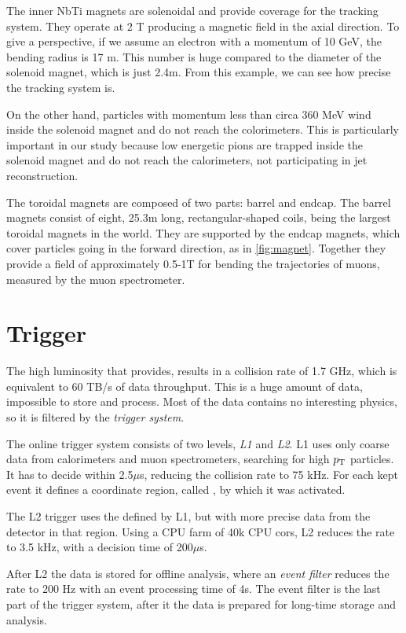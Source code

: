 The inner NbTi magnets are solenoidal and provide coverage for the tracking system.
They operate at 2 T producing a magnetic field in the axial direction.
To give a perspective, if we assume an electron with a momentum of 10 GeV, the bending radius is 17 m.
This number is huge compared to the diameter of the solenoid magnet, which is just 2.4m. 
From this example, we can see how precise the tracking system is.

On the other hand, particles with momentum less than circa 360 MeV wind inside the solenoid magnet and do not reach the colorimeters.
This is particularly important in our study because low energetic pions are trapped inside the solenoid magnet and do not reach the calorimeters, not participating in jet reconstruction.

The toroidal magnets are composed of two parts: barrel and endcap.
The barrel magnets consist of eight, 25.3m long, rectangular-shaped coils, being the largest toroidal magnets in the world.
They are supported by the endcap magnets, which cover particles going in the forward direction, as in \cref{fig:magnet}.
Together they provide a field of approximately 0.5-1T for bending the trajectories of muons, measured by the muon spectrometer. 


\section{Trigger}
\label{sec:trigger}
The high luminosity that \LHC provides, results in a collision rate of 1.7 GHz, which is equivalent to 60 TB/s of data throughput.
This is a huge amount of data, impossible to store and process.
Most of the data contains no interesting physics, so it is filtered by the \emph{trigger system}.

The online trigger system consists of two levels, \emph{L1} and \emph{L2}. 
L1 uses only coarse data from calorimeters and muon spectrometers, searching for high $p_\text{T}$ particles.
It has to decide within 2.5$\mu$s, reducing the collision rate to 75 kHz.
For each kept event it defines a coordinate region, called \RoI, by which it was activated. 

The L2 trigger uses the \RoI defined by L1, but with more precise data from the detector in that region.
Using a CPU farm of 40k CPU cors, L2 reduces the rate to 3.5 kHz, with a decision time of 200$\mu$s.

After L2 the data is stored for offline analysis, where an \emph{event filter} reduces the rate to 200 Hz with an event processing time of 4s.
The event filter is the last part of the trigger system, after it the data is prepared for long-time storage and analysis.